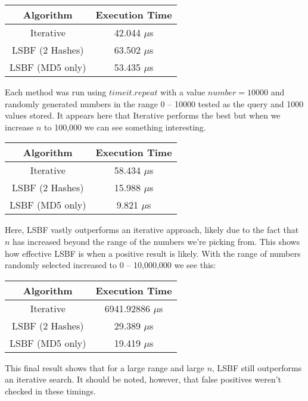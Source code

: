 \begin{tabular}{|c|c|}
	\hline 
	\textbf{Algorithm} & \textbf{Execution Time} \\ 
	\hline 
	Iterative & 42.044 $ \mu $s \\ 
	\hline 
	LSBF (2 Hashes)& 63.502 $ \mu $s \\ 
	\hline 
	LSBF (MD5 only)& 53.435 $ \mu $s \\ 
	\hline 
\end{tabular} 

Each method was run using $timeit.repeat$ with a value $number=10000$ and randomly generated numbers in the range 0 -- 10000 tested as the query and 1000 values stored. It appears here that Iterative performs the best but when we increase $ n $ to 100,000 we can see something interesting.

\begin{tabular}{|c|c|}
	\hline 
	\textbf{Algorithm} & \textbf{Execution Time} \\ 
	\hline 
	Iterative & 58.434 $ \mu $s \\ 
	\hline 
	LSBF (2 Hashes)& 15.988 $ \mu $s \\ 
	\hline 
	LSBF (MD5 only)& 9.821 $ \mu $s \\ 
	\hline 
\end{tabular} 

Here, LSBF vastly outperforms an iterative approach, likely due to the fact that $n$ has increased beyond the range of the numbers we're picking from. This shows how effective LSBF is when a positive result is likely. With the range of numbers randomly selected increased to 0 -- 10,000,000 we see this:

\begin{tabular}{|c|c|}
	\hline 
	\textbf{Algorithm} & \textbf{Execution Time} \\ 
	\hline 
	Iterative & 6941.92886 $ \mu $s \\ 
	\hline 
	LSBF (2 Hashes)& 29.389 $ \mu $s \\ 
	\hline 
	LSBF (MD5 only)& 19.419 $ \mu $s \\ 
	\hline 
\end{tabular} 

This final result shows that for a large range and large $n$, LSBF still outperforms an iterative search. It should be noted, however, that false positives weren't checked in these timings.